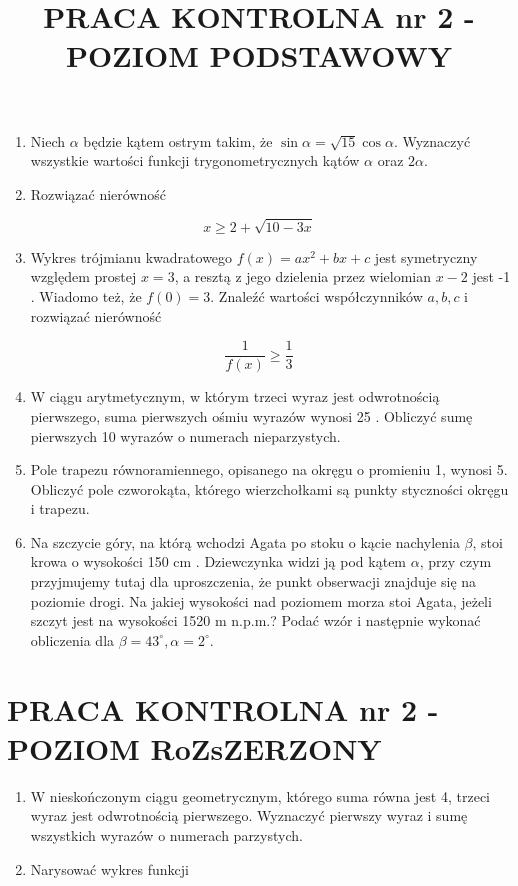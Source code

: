 \documentclass[10pt]{article}
\title{PRACA KONTROLNA nr 2 - POZIOM PODSTAWOWY }
\author{}
\date{}
\begin{document}
\maketitle
\begin{enumerate}
  \item Niech $\alpha$ będzie kątem ostrym takim, że $\sin \alpha=\sqrt{15} \cos \alpha$. Wyznaczyć wszystkie wartości funkcji trygonometrycznych kątów $\alpha$ oraz $2 \alpha$.
  \item Rozwiązać nierówność
\end{enumerate}

$$
x \geqslant 2+\sqrt{10-3 x}
$$

\begin{enumerate}
  \setcounter{enumi}{2}
  \item Wykres trójmianu kwadratowego $f(x)=a x^{2}+b x+c$ jest symetryczny względem prostej $x=3$, a resztą z jego dzielenia przez wielomian $x-2$ jest -1 . Wiadomo też, że $f(0)=3$. Znaleźć wartości współczynników $a, b, c$ i rozwiązać nierówność
\end{enumerate}

$$
\frac{1}{f(x)} \geqslant \frac{1}{3}
$$

\begin{enumerate}
  \setcounter{enumi}{3}
  \item W ciągu arytmetycznym, w którym trzeci wyraz jest odwrotnością pierwszego, suma pierwszych ośmiu wyrazów wynosi 25 . Obliczyć sumę pierwszych 10 wyrazów o numerach nieparzystych.
  \item Pole trapezu równoramiennego, opisanego na okręgu o promieniu 1, wynosi 5. Obliczyć pole czworokąta, którego wierzchołkami są punkty styczności okręgu i trapezu.
  \item Na szczycie góry, na którą wchodzi Agata po stoku o kącie nachylenia $\beta$, stoi krowa o wysokości 150 cm . Dziewczynka widzi ją pod kątem $\alpha$, przy czym przyjmujemy tutaj dla uproszczenia, że punkt obserwacji znajduje się na poziomie drogi. Na jakiej wysokości nad poziomem morza stoi Agata, jeżeli szczyt jest na wysokości 1520 m n.p.m.? Podać wzór i następnie wykonać obliczenia dla $\beta=43^{\circ}, \alpha=2^{\circ}$.
\end{enumerate}

\section*{PRACA KONTROLNA nr 2 - POZIOM RoZsZERZONY}
\begin{enumerate}
  \item W nieskończonym ciągu geometrycznym, którego suma równa jest 4, trzeci wyraz jest odwrotnością pierwszego. Wyznaczyć pierwszy wyraz i sumę wszystkich wyrazów o numerach parzystych.
  \item Narysować wykres funkcji
\end{enumerate}
\end{document}
